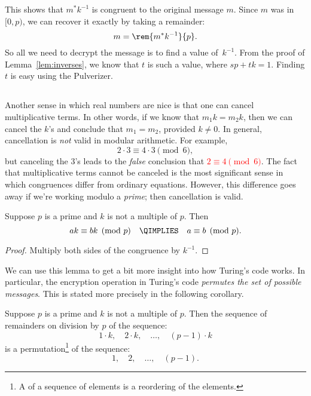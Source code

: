 This shows that $m^* k^{-1}$ is congruent to the original message $m$.
Since $m$ was in $[0,p)$, we can recover it exactly by taking a
remainder:
%
\[
m = \rem{m^* k^{-1}}{p}.
\]
%
So all we need to decrypt the message is to find a value of~$k^{-1}$.
From the proof of Lemma~\ref{lem:inverses}, we know that $t$ is such a
value, where $sp + tk = 1$.  Finding $t$ is easy using the Pulverizer.

\subsection{}

Another sense in which real numbers are nice is that one can cancel
multiplicative terms.  In other words, if we know that $m_1 k = m_2 k$,
then we can cancel the $k$'s and conclude that $m_1 = m_2$, provided $k
\neq 0$.  In general, cancellation is \emph{not} valid in modular
arithmetic.  For example,
%
\[
2 \cdot 3 \equiv 4 \cdot 3 \pmod{6},
\]
%
but canceling the 3's leads to the \emph{false} conclusion
that \textcolor{red}{$2 \equiv 4 \pmod{6}$}.  The fact that
multiplicative terms cannot be canceled is the most significant
sense in which congruences differ from ordinary equations.  However,
this difference goes away if we're working modulo a
\emph{prime}; then cancellation is valid.

\begin{lemma}
\label{lem:cancel}
Suppose $p$ is a prime and $k$ is not a multiple of $p$.  Then
%
\[
ak \equiv bk \pmod{p}\quad \QIMPLIES\quad a \equiv b \pmod{p}.
\]
\end{lemma}

\begin{proof}
Multiply both sides of the congruence by $k^{-1}$.
\end{proof}

We can use this lemma to get a bit more insight into how Turing's code
works.  In particular, the encryption operation in Turing's code
\emph{permutes the set of possible messages}.  This is stated more
precisely in the following corollary.

\begin{corollary}
\label{cor:prime-permutes}
Suppose $p$ is a prime and $k$ is not a multiple of $p$.  Then the
sequence of remainders on division by $p$ of the sequence:
\[
1 \cdot k,\quad
2 \cdot k,\quad
 \dots,\quad
(p-1) \cdot k
\]
is a permutation\footnote{A  of a sequence of elements
is a reordering of the elements.} of the sequence:
\[
1,\quad 2,\quad \dots,\quad (p - 1).
\]
\end{corollary}


